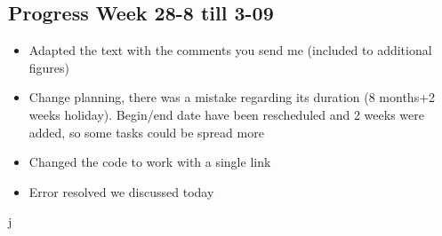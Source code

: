 \subsection*{Progress Week 28-8 till 3-09 }


\begin{itemize}
    \item Adapted the text with the comments you send me (included to additional figures)
    \item Change planning, there was a mistake regarding its duration (8 months+2 weeks holiday). Begin/end date have been rescheduled and 2 weeks were added, so some tasks could be spread more
    \item Changed the code to work with a single link
    \item Error resolved we discussed today
\end{itemize}j





